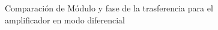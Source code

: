 \begin{figure}[H]
    \centering
{}
\caption{Comparaci\'on de M\'odulo y fase de la trasferencia para el amplificador en modo diferencial}
\label{fig:Comp_diff}
\end{figure}

